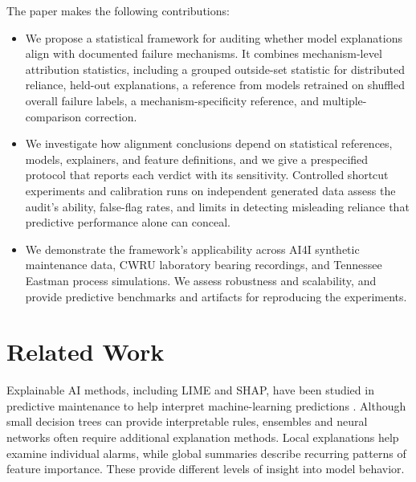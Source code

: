 \documentclass[conference]{IEEEtran}
\begin{document}
The paper makes the following contributions:

\begin{itemize}
    \item We propose a statistical framework for auditing whether model explanations align with documented failure mechanisms. It combines mechanism-level attribution statistics, including a grouped outside-set statistic for distributed reliance, held-out explanations, a reference from models retrained on shuffled overall failure labels, a mechanism-specificity reference, and multiple-comparison correction.

    \item We investigate how alignment conclusions depend on statistical references, models, explainers, and feature definitions, and we give a prespecified protocol that reports each verdict with its sensitivity. Controlled shortcut experiments and calibration runs on independent generated data assess the audit's ability, false-flag rates, and limits in detecting misleading reliance that predictive performance alone can conceal.

    \item We demonstrate the framework's applicability across AI4I synthetic maintenance data, CWRU laboratory bearing recordings, and Tennessee Eastman process simulations. We assess robustness and scalability, and provide predictive benchmarks and artifacts for reproducing the experiments.

\end{itemize}


\section{Related Work}
\label{sec:related}

Explainable AI methods, including LIME and SHAP, have been studied in predictive maintenance to help interpret machine-learning predictions \cite{cummins2024survey,steurtewagen2021adding,gawde2024explainable}. Although small decision trees can provide interpretable rules, ensembles and neural networks often require additional explanation methods. Local explanations help examine individual alarms, while global summaries describe recurring patterns of feature importance. These provide different levels of insight into model behavior.
\end{document}
